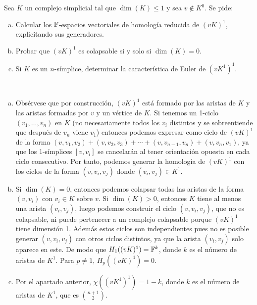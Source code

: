 \documentclass[twoside]{article}
\begin{document}
\begin{ejercicio}{3}
Sea $K$ un complejo simplicial tal que $\dim(K)\leq 1$ y sea $v\notin K^0$. Se pide:
\begin{enumerate}[(a)]
\item Calcular los $\mathbb{F}$-espacios vectoriales de homología reducida de $(vK)^1$, explicitando sus generadores. 
\item Probar que $(vK)^1$ es colapsable si y solo si $\dim(K)=0$. 
\item Si $K$ es un $n$-símplice, determinar la característica de Euler de $(vK^1)^1$. 
\end{enumerate}
\end{ejercicio}
\begin{solucion}\
\begin{enumerate}[(a)]
\item Obsérvese que por construcción, $(vK)^1$ está formado por las aristas de $K$ y las aristas formadas por $v$ y un vértice de $K$. Si tenemos un 1-ciclo $(v_1,\dots, v_n)$ en $K$ (no necesariamente todos los $v_i$ distintos y se sobreentiende que después de $v_n$ viene $v_1$) entonces podemos expresar como ciclo de $(vK)^1$ de la forma $(v, v_1,v_2)+(v,v_2,v_3)+\cdots+(v,v_{n-1}, v_n)+(v,v_n,v_1)$, ya que los 1-símplices $[v,v_i]$ se cancelarán al tener orientación opuesta en cada ciclo consecutivo. Por tanto, podemos generar la homología de $(vK)^1$ con los ciclos de la forma $(v,v_i,v_j)$ donde $(v_i,v_j)\in K^1$. 
\item Si $\dim(K)=0$, entonces podemos colapsar todas las aristas de la forma $(v,v_i)$ con $v_i\in K$ sobre $v$. Si $\dim(K)>0$, entonces $K$ tiene al menos una arista $(v_i,v_j)$, luego podemos construir el ciclo $(v,v_i,v_j)$, que no es colapsable, ni puede pertenecer a un complejo colapsable porque $(vK)^1$ tiene dimensión 1. Además estos ciclos son independientes pues no es posible generar $(v, v_i,v_j)$ con otros ciclos distintos, ya que la arista $(v_i,v_j)$ solo aparece en este. De modo que $H_1((vK)^1)=\mathbb{F}^k$, donde $k$ es el número de aristas de $K^1$. Para $p\neq 1$, $H_p((vK)^1)=0$.
\item Por el apartado anterior, $\chi((vK^1)^1)=1-k$, donde $k$ es el número de aristas de $K^1$, que es $\binom{n+1}{2}$. 
\end{enumerate}
\end{solucion}
\end{document}
